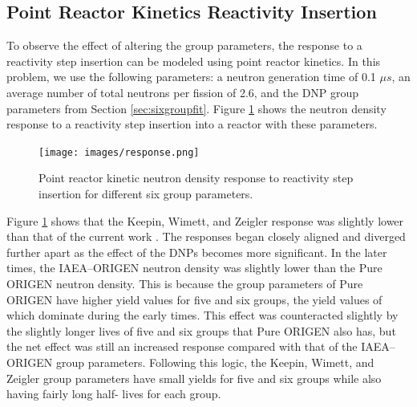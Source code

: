 \documentclass{style/nseJournal}
\begin{document}





\subsection{Point Reactor Kinetics Reactivity Insertion}

To observe the effect of altering the group parameters, the response to a reactivity step insertion can be modeled using point reactor kinetics.
In this problem, we use the following parameters: a neutron generation time of 0.1 $\mu s$, an average number of total neutrons per fission of 2.6, and the DNP group parameters from Section \ref{sec:sixgroupfit}.
Figure \ref{fig:PRK-resp} shows the neutron density response to a reactivity step insertion into a reactor with these parameters.

\begin{figure}[]
\centering
\texttt{[image: images/response.png]}
\caption{Point reactor kinetic neutron density response to reactivity step insertion for different six group parameters.}
\label{fig:PRK-resp}
\end{figure}

Figure \ref{fig:PRK-resp} shows that the Keepin, Wimett, and Zeigler response was slightly lower than that of the current work \cite{KEEPIN1957IN2}. The responses began closely aligned and diverged further apart as the effect of the DNPs becomes more significant. In the later times, the IAEA--ORIGEN neutron density was slightly lower than the Pure ORIGEN neutron density. This is because the group parameters of Pure ORIGEN have higher yield values for five and six groups, the yield values of which dominate during the early times. This effect was counteracted slightly by the slightly longer lives of five and six groups that Pure ORIGEN also has, but the net effect was still an increased response compared with that of the IAEA--ORIGEN group parameters. Following this logic, the Keepin, Wimett, and Zeigler group parameters have small yields for five and six groups while also having fairly long half- lives for each group.
\end{document}
